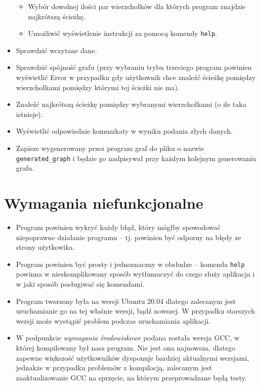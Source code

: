 \documentclass[12pt, a4paper]{article}
\begin{document}
\begin{itemize}
\begin{itemize}
\begin{itemize}
        \end{itemize}
        \item Wybór dowolnej ilości par wierzchołków dla których program znajdzie najkrótszą ścieżkę.
        \item Umożliwić wyświetlenie instrukcji za pomocą komendy \texttt{help}.
    \end{itemize}
    \item Sprawdzić wczytane dane.
    \item Sprawdzić spójność grafu (przy wybraniu trybu trzeciego program powinien wyświetlić Error w przypadku gdy użytkownik chce znaleźć ścieżkę pomiędzy wierzchołkami pomiędzy którymi tej ścieżki nie ma).
    \item Znaleźć najkrótszą ścieżkę pomiędzy wybranymi wierzchołkami (o ile taka istnieje).
    \item Wyświetlić odpowiednie komunikaty w wyniku podania złych danych.
    \item Zapisze wygenerowany przez program graf do pliku o nazwie \texttt{generated\_graph} i będzie go nadpisywał przy każdym kolejnym generowaniu grafu.
\end{itemize}

\section{Wymagania niefunkcjonalne}
\begin{itemize}
    \item Program powinien wykryć każdy błąd, który mógłby spowodować niepoprawne działanie programu -- tj. powinien być odporny na błędy ze strony użytkowika.
    \item Program powinien być prosty i jednoznaczny w obsłudze -- komenda \texttt{help} powinna w nieskomplikowany sposób wytłumaczyć do czego służy aplikacja i w jaki sposób posługiwać się komendami.
    \item Program tworzony była na wersji Ubuntu 20.04 dlatego zalecanym jest uruchamianie go na tej właśnie wersji, bądź nowszej. W przypadku starszych wersji może wystąpić problem podczas uruchamiania aplikacji. \newpage
    \item W podpunkcie \textit{wymagania środowiskowe} podana została wersja GCC, w której kompilowany był nasz program. Nie jest ona najnowsza, dlatego zapewne większość użytkowników dysponuje bardziej aktualnymi wersjami, jednakże w przypadku problemów z kompilacją, zalecanym jest zaaktualizowanie GCC na sprzęcie, na którym przeprowadzane będą testy.
\end{itemize}
\end{document}
